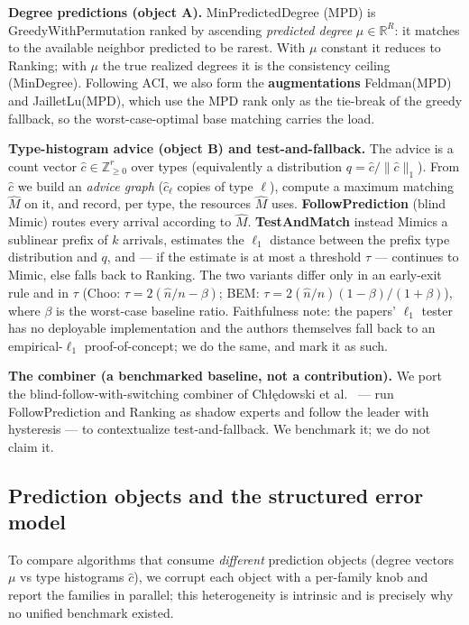 \textbf{Degree predictions (object A).} MinPredictedDegree (MPD)
\cite{aci2022mpd} is GreedyWithPermutation ranked by ascending
\emph{predicted degree} \(\mu\in\mathbb{R}^{R}\): it matches to the
available neighbor predicted to be rarest. With \(\mu\) constant it
reduces to Ranking; with \(\mu\) the true realized degrees it is the
consistency ceiling (MinDegree). Following ACI, we also form the
\textbf{augmentations} Feldman(MPD) and JailletLu(MPD), which use the
MPD rank only as the tie-break of the greedy fallback, so the
worst-case-optimal base matching carries the load.

\textbf{Type-histogram advice (object B) and test-and-fallback.} The
advice is a count vector \(\hat c\in\mathbb{Z}_{\ge 0}^{r}\) over types
(equivalently a distribution \(q=\hat c/\|\hat
c\|_1\)). From \(\hat c\) we build an \emph{advice graph}
(\(\hat c_\ell\) copies of type \(\ell\)), compute a maximum matching
\(\hat M\) on it, and record, per type, the resources \(\hat M\) uses.
\textbf{FollowPrediction} (blind Mimic) routes every arrival according
to \(\hat M\). \textbf{TestAndMatch}
\cite{choo2024imperfect,bem2026testmatch} instead Mimics a sublinear
prefix of \(k\) arrivals, estimates the \(\ell_1\) distance between the
prefix type distribution and \(q\), and --- if the estimate is at most a
threshold \(\tau\) --- continues to Mimic, else falls back to Ranking.
The two variants differ only in an early-exit rule and in \(\tau\)
(Choo: \(\tau =
2(\hat n/n - \beta)\); BEM: \(\tau = 2(\hat n/n)(1-\beta)/(1+\beta)\)),
where \(\beta\) is the worst-case baseline ratio. Faithfulness note: the
papers' \(\ell_1\) tester \cite{jiao2018l1} has no deployable
implementation and the authors themselves fall back to an
empirical-\(\ell_1\) proof-of-concept; we do the same, and mark it as
such.

\textbf{The combiner (a benchmarked baseline, not a contribution).} We
port the blind-follow-with-switching combiner of Chłędowski et
al.~\cite{chledowski2021caching} --- run FollowPrediction and Ranking as
shadow experts and follow the leader with hysteresis --- to
contextualize test-and-fallback. We benchmark it; we do not claim it.

\subsection{Prediction objects and the structured error
model}

To compare algorithms that consume \emph{different} prediction objects
(degree vectors \(\mu\) vs type histograms \(\hat c\)), we corrupt each
object with a per-family knob and report the families in parallel; this
heterogeneity is intrinsic and is precisely why no unified benchmark
existed.

